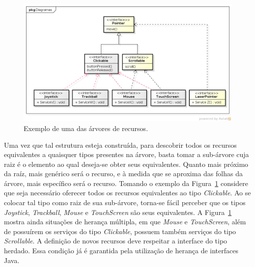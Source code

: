 \begin{figure}[ht]
	\center
	\includegraphics[scale=0.55]{imagens/arvoreDeRecursos}
	\caption{Exemplo de uma das árvores de recursos.}
	\label{fig:arvoreDeRecursos}
\end{figure}

Uma vez que tal estrutura esteja construída, para descobrir todos os recursos equivalentes a quaisquer tipos presentes na árvore, basta tomar a sub-árvore cuja raiz é o elemento ao qual deseja-se obter seus equivalentes. Quanto mais próximo da raíz, mais genérico será o recurso, e à medida que se aproxima das folhas da árvore, mais específico será o recurso. Tomando o exemplo da Figura~\ref{fig:arvoreDeRecursos} considere que seja necessário oferecer todos os recursos equivalentes ao tipo \emph{Clickable}. Ao se colocar tal tipo como raiz de sua sub-árvore, torna-se fácil perceber que os tipos \emph{Joystick}, \emph{Trackball}, \emph{Mouse} e \emph{TouchScreen} são seus equivalentes. A Figura~\ref{fig:arvoreDeRecursos} mostra ainda situações de herança múltipla, em que \emph{Mouse} e \emph{TouchScreen}, além de possuírem os serviços do tipo \emph{Clickable}, possuem também serviços do tipo \emph{Scrollable}. A definição de novos recursos deve respeitar a interface do tipo herdado. Essa condição já é garantida pela utilização de herança de interfaces Java.
